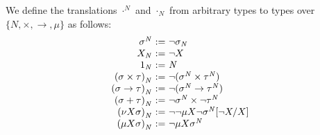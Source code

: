 \documentclass[10pt,a4paper]{amsart}
\theoremstyle{plain}
\theoremstyle{definition}
\theoremstyle{plain}
\theoremstyle{definition} %
\newcommand{\nat}{\mathit{N}}
\newcommand{\N}{\nat} %
\newcommand{\negtrans}[1]{{#1}^{\N}}
\newcommand{\unnegtrans}[1]{{#1}_{\N}}
\newcommand{\negn}{\neg}
\begin{document}
We define the translations $\negtrans \cdot$ and $\unnegtrans \cdot$ from arbitrary types to types over $\{\N,\times, \to , \mu\}$ as follows:
\[
\begin{array}{r@{\ := \ }l}
\negtrans \sigma & \neg \unnegtrans \sigma\\ 
\unnegtrans X & \negn X \\
    \unnegtrans 1 & \N \\
    \unnegtrans{(\sigma \times \tau)} & \negn (\negtrans \sigma \times \negtrans \tau) \\
    \unnegtrans{(\sigma \to \tau)} & \neg( \negtrans\sigma \to \negtrans \tau) \\
    \unnegtrans{(\sigma+\tau)} & \neg   \negtrans \sigma \times \neg \negtrans \tau \\
    \unnegtrans{(\nu X \sigma)} & \neg \neg \mu X \negn \negtrans\sigma[\negn X / X] \\
    \unnegtrans{(\mu X \sigma)} &  \neg \mu X \negtrans{\sigma}
\end{array}
\]
\end{document}

